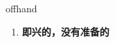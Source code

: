 
\begin{frame}
{\huge offhand}
\begin{center}
\begin{enumerate}\Large
  \item \textbf{即兴的，没有准备的}
\end{enumerate}
\end{center}
\end{frame}

